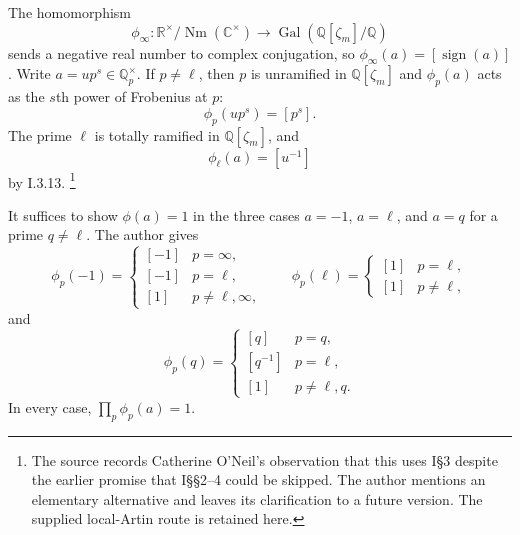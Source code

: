 \documentclass[11pt]{article}
\newcommand{\Q}{\mathbb Q}
\newcommand{\Nm}{\operatorname{Nm}}
\newcommand{\Gal}{\operatorname{Gal}}
\begin{document}
The homomorphism
\[
 \phi_\infty:\mathbb R^\times/\Nm(\mathbb C^\times)
 \longrightarrow\Gal(\Q[\zeta_m]/\Q)
\]
sends a negative real number to complex conjugation, so
$\phi_\infty(a)=[\operatorname{sign}(a)]$.
Write $a=u p^s\in\Q_p^\times$. If $p\ne\ell$, then $p$ is unramified in
$\Q[\zeta_m]$ and $\phi_p(a)$ acts as the $s$th power of Frobenius at $p$:
\[
 \phi_p(u p^s)=[p^s].
\]
The prime $\ell$ is totally ramified in $\Q[\zeta_m]$, and
\[
 \phi_\ell(a)=[u^{-1}]
\]
by I.3.13.
\footnote{The source records Catherine O'Neil's observation that this uses
I\S3 despite the earlier promise that I\S\S2--4 could be skipped.
The author mentions an elementary alternative and leaves its clarification
to a future version. The supplied local-Artin route is retained here.}

It suffices to show $\phi(a)=1$ in the three cases
$a=-1$, $a=\ell$, and $a=q$ for a prime $q\ne\ell$.
The author gives
\[
 \phi_p(-1)=
 \begin{cases}
 [-1]&p=\infty,\\
 [-1]&p=\ell,\\
 [1]&p\ne\ell,\infty,
 \end{cases}
 \qquad
 \phi_p(\ell)=
 \begin{cases}
 [1]&p=\ell,\\
 [1]&p\ne\ell,
 \end{cases}
\]
and
\[
 \phi_p(q)=
 \begin{cases}
 [q]&p=q,\\
 [q^{-1}]&p=\ell,\\
 [1]&p\ne\ell,q.
 \end{cases}
\]
In every case, $\prod_p\phi_p(a)=1$.
\end{document}
